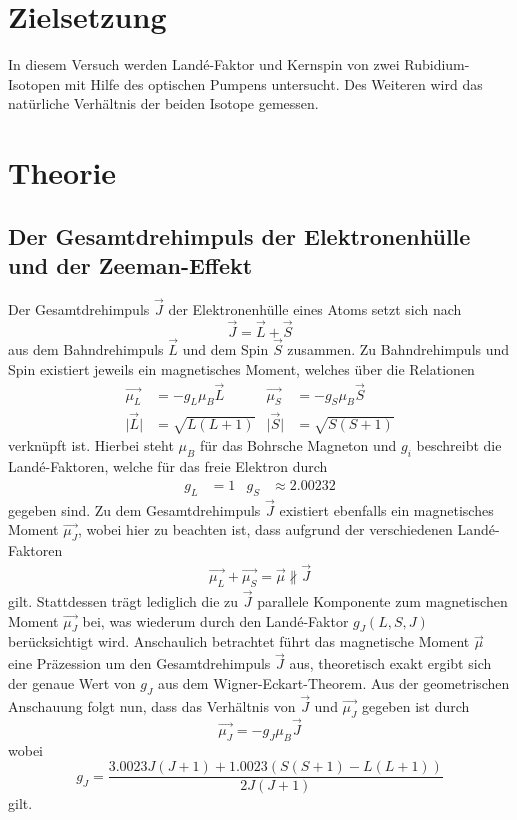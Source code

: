 \section{Zielsetzung}
In diesem Versuch werden Land\'{e}-Faktor und Kernspin von zwei Rubidium-Isotopen mit Hilfe des optischen Pumpens untersucht.
Des Weiteren wird das natürliche Verhältnis der beiden Isotope gemessen.

\section{Theorie}
\label{sec:Theorie}

\subsection{Der Gesamtdrehimpuls der Elektronenhülle und der Zeeman-Effekt}
Der Gesamtdrehimpuls $\vec{J}$ der Elektronenhülle eines Atoms setzt sich nach
\begin{equation}
  \vec{J} = \vec{L} + \vec{S}
\end{equation}
aus dem Bahndrehimpuls $\vec{L}$ und dem Spin $\vec{S}$ zusammen.
Zu Bahndrehimpuls und Spin existiert jeweils ein magnetisches Moment, welches über die Relationen
\begin{align}
  \vec{\mu_L} &= - g_L \mu_B \vec{L} & \vec{\mu_S} &= - g_S \mu_B \vec{S} \\
  \lvert \vec{L} \rvert &= \sqrt{L(L+1)} & \lvert \vec{S} \rvert &= \sqrt{S(S+1)}
\end{align}
verknüpft ist.
Hierbei steht $\mu_B$ für das Bohrsche Magneton und $g_i$ beschreibt die Land\'{e}-Faktoren, welche für das freie Elektron durch
\begin{align}
  \label{eqn:5}
  g_L &= 1 & g_S &\approx \num{2.00232}
\end{align}
gegeben sind.
Zu dem Gesamtdrehimpuls $\vec{J}$ existiert ebenfalls ein magnetisches Moment $\vec{\mu_J}$, wobei hier zu beachten ist, dass aufgrund der verschiedenen Land\'{e}-Faktoren
\begin{align*}
  \vec{\mu_L} + \vec{\mu_S} = \vec{\mu} \nparallel \vec{J}
\end{align*}
gilt.
Stattdessen trägt lediglich die zu $\vec{J}$ parallele Komponente zum magnetischen Moment $\vec{\mu_J}$ bei, was wiederum durch den Land\'{e}-Faktor $g_J(L, S, J)$ berücksichtigt wird.
Anschaulich betrachtet führt das magnetische Moment $\vec{\mu}$ eine Präzession um den Gesamtdrehimpuls $\vec{J}$ aus, theoretisch exakt ergibt sich der genaue Wert von $g_J$ aus dem Wigner-Eckart-Theorem.
Aus der geometrischen Anschauung folgt nun, dass das Verhältnis von $\vec{J}$ und $\vec{\mu_J}$ gegeben ist durch
\begin{equation}
  \vec{\mu_J} = - g_J \mu_B \vec{J}
\end{equation}
wobei
\begin{equation}
  g_J = \frac{ \num{3.0023} J \left(J+1\right) + \num{1.0023} \left( S \left( S+1 \right) - L \left(L+1\right) \right) }{ 2 J \left(J+1\right) }
\end{equation}
gilt. \\


